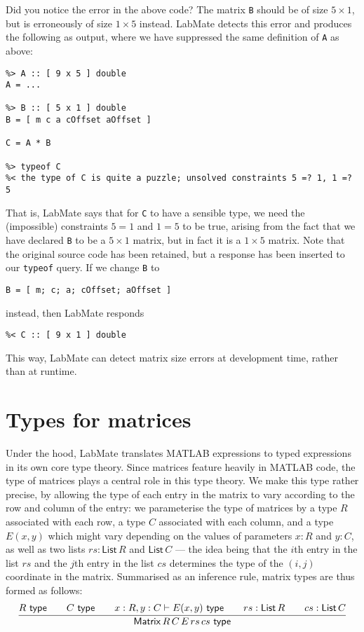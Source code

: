 \documentclass{ws-procs9x6}
\newcommand{\istype}[1]{#1\ \textsf{type}}
\newcommand{\Matrix}[5]{\mathsf{Matrix}\,#1\,#2\,#3\,#4\,#5}
\newcommand{\List}[1]{\mathsf{List}\,#1}
\begin{document}
Did you notice the error in the above code? The matrix \texttt{B} should be of size $5 \times 1$, but is erroneously of size $1 \times 5$ instead. LabMate detects this error and produces the following as output, where we have suppressed the same definition of \texttt{A} as above:
\begin{verbatim}
%> A :: [ 9 x 5 ] double
A = ...

%> B :: [ 5 x 1 ] double
B = [ m c a cOffset aOffset ]

C = A * B

%> typeof C
%< the type of C is quite a puzzle; unsolved constraints 5 =? 1, 1 =? 5
\end{verbatim}
%
That is, LabMate says that for \texttt{C} to have a sensible type, we need the (impossible) constraints $5 = 1$ and $1 = 5$ to be true, arising from the fact that we have declared \texttt{B} to be a $5 \times 1$ matrix, but in fact it is a $1 \times 5$ matrix. Note that the original source code has been retained, but a response has been inserted to our \texttt{typeof} query. If we change \texttt{B} to
\begin{verbatim}
B = [ m; c; a; cOffset; aOffset ]
\end{verbatim}
instead, then LabMate responds
\begin{verbatim}
%< C :: [ 9 x 1 ] double
\end{verbatim}
This way, LabMate can detect matrix size errors at development time, rather than at runtime.

\section{Types for matrices}

Under the hood, LabMate translates MATLAB expressions to typed
expressions in its own core type theory.
%
Since matrices feature heavily in MATLAB code, the type of matrices
plays a central role in this type theory.
%
We make this type rather precise, by allowing the type of each entry
in the matrix to vary according to the row and column of the entry:
%
we parameterise the type of matrices by a type $R$ associated with
each row, a type $C$ associated with each column, and a type $E(x,y)$
which might vary depending on the values of parameters $x : R$ and
$y : C$, as well as two lists $rs : \List{R}$ and $\List{C}$ --- the
idea being that the $i$th entry in the list $rs$ and the $j$th entry
in the list $cs$ determines the type of the $(i, j)$ coordinate in the
matrix.
%
Summarised as an inference rule, matrix types are thus formed as follows:
%
\[
  \infer{\istype{\Matrix{R}{C}{E}{rs}{cs}}}
  {
    \istype{R}
    &\quad
    \istype{C}
    &\quad
    x : R, y : C \vdash \istype{E(x,y)}
    &\quad
    rs : \List{R}
    &\quad
    cs : \List{C}
  }
\]
\end{document}
